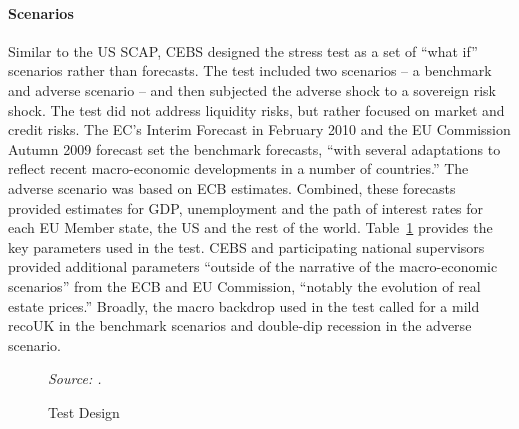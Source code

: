 \documentclass[12pt]{article}
\begin{document}
\paragraph{Scenarios}

Similar to the US SCAP, CEBS designed the stress test as a set of ``what if'' scenarios rather than forecasts. The test included two scenarios -- a benchmark and adverse scenario -- and then subjected the adverse shock to a sovereign risk shock. The test did not address liquidity risks, but rather focused on market and credit risks. The EC's Interim Forecast in February 2010 and the EU Commission Autumn 2009 forecast set the benchmark forecasts, ``with several adaptations to reflect recent macro-economic developments in a number of countries.'' The adverse scenario was based on ECB estimates. Combined, these forecasts provided estimates for GDP, unemployment and the path of interest rates for each EU Member state, the US and the rest of the world. Table~\ref{design} provides the key parameters used in the test. CEBS and participating national supervisors provided additional parameters ``outside of the narrative of the macro-economic scenarios'' from the ECB and EU Commission, ``notably the evolution of real estate prices.'' Broadly, the macro backdrop used in the test called for a mild recoUK in the benchmark scenarios and double-dip recession in the adverse scenario.


\begin{figure}[h]
\caption{Test Design}\label{design}
\noindent
{}%

\textit{\footnotesize Source: \citet{Deutsche}.}
\end{figure}
\end{document}
